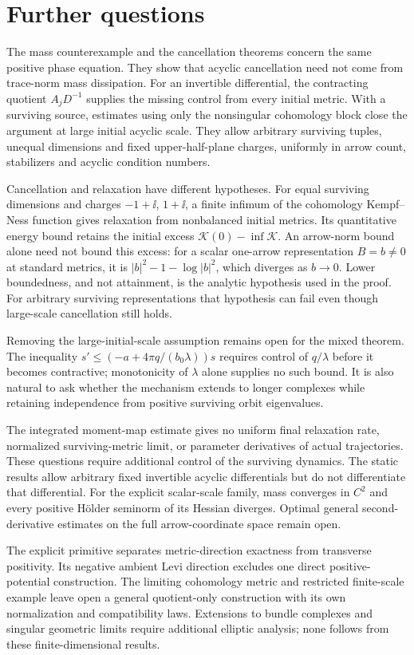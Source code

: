 \section{Further questions}\label{sec:questions}

The mass counterexample and the cancellation theorems concern the same
positive phase equation. They show that acyclic cancellation need not
come from trace-norm mass dissipation. For an invertible differential,
the contracting quotient $A_jD^{-1}$ supplies the missing control from
every initial metric. With a surviving source, estimates using only the
nonsingular cohomology block close the argument at large initial acyclic
scale. They allow arbitrary surviving tuples, unequal dimensions and
fixed upper-half-plane charges, uniformly in arrow count, stabilizers
and acyclic condition numbers.

Cancellation and relaxation have different hypotheses. For equal surviving
dimensions and charges $-1+\ii$, $1+\ii$, a finite infimum of the
cohomology Kempf--Ness function gives relaxation from nonbalanced initial
metrics. Its quantitative energy bound retains the initial excess
$\mathcal K(0)-\inf\mathcal K$. An arrow-norm bound alone need not bound
this excess: for a scalar one-arrow representation $B=b\ne0$ at standard
metrics, it is $|b|^2-1-\log|b|^2$, which diverges as $b\to0$.
Lower boundedness, and not attainment, is the analytic hypothesis used
in the proof. For arbitrary surviving representations that hypothesis
can fail even though large-scale cancellation still holds.

Removing the large-initial-scale assumption remains open for the mixed
theorem. The inequality
$s'\leq(-a+4\pi q/(b_0\lambda))s$ requires control of $q/\lambda$
before it becomes contractive; monotonicity of $\lambda$ alone supplies
no such bound. It is also natural to ask whether the mechanism extends
to longer complexes while retaining independence from positive
surviving orbit eigenvalues.

The integrated moment-map estimate gives no uniform final relaxation
rate, normalized surviving-metric limit, or parameter derivatives of
actual trajectories. These questions require additional control of the
surviving dynamics. The static results allow arbitrary fixed invertible
acyclic differentials but do not differentiate that differential.
For the explicit scalar-scale family, mass converges in $C^2$ and every
positive H\"older seminorm of its Hessian diverges. Optimal general
second-derivative estimates on the full arrow-coordinate space remain open.

The explicit primitive separates metric-direction exactness from
transverse positivity. Its negative ambient Levi direction excludes
one direct positive-potential construction. The limiting cohomology
metric and restricted finite-scale example leave open a general
quotient-only construction with its own normalization and compatibility
laws. Extensions to bundle complexes and singular geometric limits
require additional elliptic analysis; none follows from these
finite-dimensional results.
